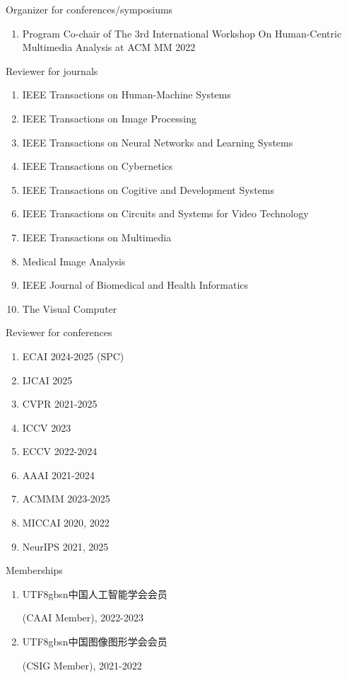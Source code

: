 \documentclass[a4paper,36pt]{article}
\newcommand{\chn}[1]{\begin{CJK}{UTF8}{gbsn}#1\end{CJK}}
\newcommand{\resumeItemWithoutTitle}[1]{
  \item\justifying\small{
    {#1 \vspace{-2pt}}
  }
}
\newcommand{\resumeSubHeadingEnumStart}{\begin{enumerate}[leftmargin=*]}
\newcommand{\resumeSubHeadingEnumEnd}{\end{enumerate}}
\begin{document}
\resumeItemWithoutTitle{Organizer for conferences/symposiums} \vspace{-5pt}
\resumeSubHeadingEnumStart
\resumeItemWithoutTitle{Program Co-chair of The 3rd International Workshop On Human-Centric Multimedia Analysis at ACM MM 2022}
\resumeSubHeadingEnumEnd

\resumeItemWithoutTitle{Reviewer for journals}\vspace{-5pt}
\resumeSubHeadingEnumStart
\resumeItemWithoutTitle{IEEE Transactions on Human-Machine Systems}
\resumeItemWithoutTitle{IEEE Transactions on Image Processing}
\resumeItemWithoutTitle{IEEE Transactions on Neural Networks and Learning Systems}
\resumeItemWithoutTitle{IEEE Transactions on Cybernetics}
\resumeItemWithoutTitle{IEEE Transactions on Cogitive and Development Systems}
\resumeItemWithoutTitle{IEEE Transactions on Circuits and Systems for Video Technology}
\resumeItemWithoutTitle{IEEE Transactions on Multimedia}
\resumeItemWithoutTitle{Medical Image Analysis}
\resumeItemWithoutTitle{IEEE Journal of Biomedical and Health Informatics}
\resumeItemWithoutTitle{The Visual Computer}
\resumeSubHeadingEnumEnd

\resumeItemWithoutTitle{Reviewer for conferences}\vspace{-5pt}
\resumeSubHeadingEnumStart
\resumeItemWithoutTitle{ECAI 2024-2025 (SPC)}
\resumeItemWithoutTitle{IJCAI 2025}
\resumeItemWithoutTitle{CVPR 2021-2025}
\resumeItemWithoutTitle{ICCV 2023}
\resumeItemWithoutTitle{ECCV 2022-2024}
\resumeItemWithoutTitle{AAAI 2021-2024}
\resumeItemWithoutTitle{ACMMM 2023-2025}
\resumeItemWithoutTitle{MICCAI 2020, 2022}
\resumeItemWithoutTitle{NeurIPS 2021, 2025}
\resumeSubHeadingEnumEnd

\resumeItemWithoutTitle{Memberships}\vspace{-5pt}
\resumeSubHeadingEnumStart
\resumeItemWithoutTitle{\chn{中国人工智能学会会员}(CAAI Member), 2022-2023}
\resumeItemWithoutTitle{\chn{中国图像图形学会会员}(CSIG Member), 2021-2022}
\resumeSubHeadingEnumEnd



\end{document}

